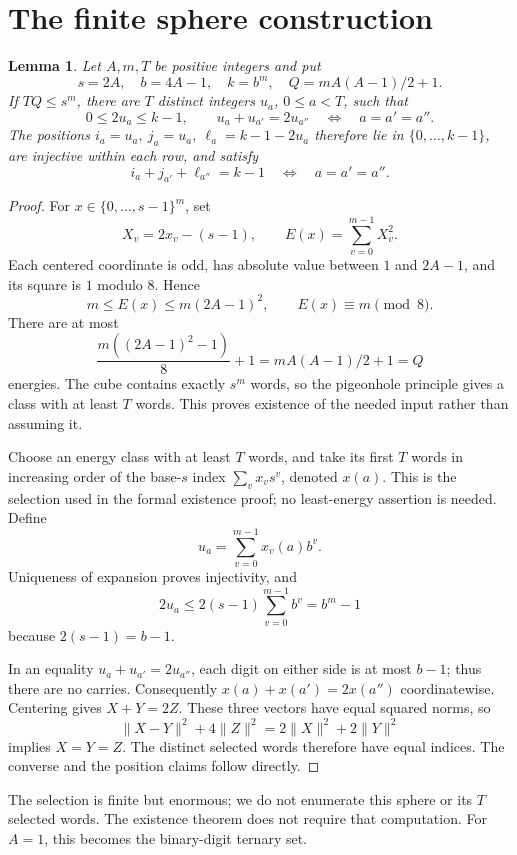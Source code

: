 \documentclass[11pt]{article}
\newtheorem{lemma}{Lemma}
\begin{document}
\section{The finite sphere construction}
\begin{lemma}\label{lem:sphere}
Let \(A,m,T\) be positive integers and put
\[
 s=2A,\quad b=4A-1,\quad k=b^m,\quad Q=mA(A-1)/2+1.
\]
If \(TQ\le s^m\), there are \(T\) distinct integers \(u_a\), \(0\le a<T\),
such that
\[
 0\le2u_a\le k-1,\qquad
 u_a+u_{a'}=2u_{a''}\quad\Longleftrightarrow\quad a=a'=a''.
\]
The positions \(i_a=u_a,\ j_a=u_a,\ \ell_a=k-1-2u_a\) therefore lie
in \(\{0,\ldots,k-1\}\), are injective within each row, and satisfy
\[
 i_a+j_{a'}+\ell_{a''}=k-1
 \quad\Longleftrightarrow\quad a=a'=a''.
\]
\end{lemma}
\begin{proof}
For \(x\in\{0,\ldots,s-1\}^m\), set
\[
 X_v=2x_v-(s-1),\qquad E(x)=\sum_{v=0}^{m-1}X_v^2.
\]
Each centered coordinate is odd, has absolute value between \(1\)
and \(2A-1\), and its square is \(1\) modulo \(8\). Hence
\[
 m\le E(x)\le m(2A-1)^2,\qquad E(x)\equiv m\pmod8.
\]
There are at most
\[
 \frac{m((2A-1)^2-1)}8+1=mA(A-1)/2+1=Q
\]
energies. The cube contains exactly \(s^m\) words, so the pigeonhole
principle gives a class with at least \(T\) words. This proves
existence of the needed input rather than assuming it.

Choose an energy class with at least \(T\) words, and take its first
\(T\) words in increasing order of the base-\(s\) index
\(\sum_v x_vs^v\), denoted \(x(a)\). This is the selection used in
the formal existence proof; no least-energy assertion is needed. Define
\[
 u_a=\sum_{v=0}^{m-1}x_v(a)b^v.
\]
Uniqueness of expansion proves injectivity, and
\[
 2u_a\le2(s-1)\sum_{v=0}^{m-1}b^v=b^m-1
\]
because \(2(s-1)=b-1\).

In an equality \(u_a+u_{a'}=2u_{a''}\), each digit on either side
is at most \(b-1\); thus there are no carries. Consequently
\(x(a)+x(a')=2x(a'')\) coordinatewise. Centering gives \(X+Y=2Z\).
These three vectors have equal squared norms, so
\[
 \|X-Y\|^2+4\|Z\|^2=2\|X\|^2+2\|Y\|^2
\]
implies \(X=Y=Z\). The distinct selected words therefore have
equal indices. The converse and the position claims follow directly.
\end{proof}
The selection is finite but enormous; we do not enumerate this sphere
or its \(T\) selected words. The existence theorem does not require
that computation. For \(A=1\), this becomes the binary-digit ternary set.
\end{document}
